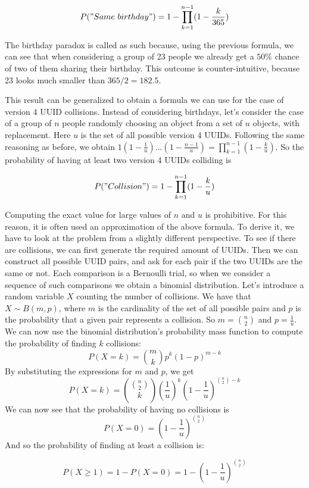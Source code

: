 \documentclass{report}
\begin{document}
$$P("Same\ birthday")=1-\prod_{k=1}^{n-1}(1-\frac{k}{365})$$

The birthday paradox is called as such because, using the previous formula, we can see that when considering a group of 23 people we already get a $50\%$ chance of two of
them sharing their birthday. This outcome is counter-intuitive, because 23 looks much smaller than $365/2=182.5$. \par

This result can be generalized to obtain a formula we can use for the case of version 4 UUID collisions. Instead of considering birthdays, let's consider the case of a group of $n$
people randomly choosing an object from a set of $u$ objects, with replacement. Here $u$ is the set of all possible version 4 UUIDs. Following the same reasoning as before, we obtain
$1(1-\frac{1}{u}) \dotso (1-\frac{n-1}{u}) = \prod_{k=1}^{n-1}(1-\frac{k}{u})$. So the probability of having at least two version 4 UUIDs colliding is

\begin{equation}\label{uuid_collision_exact_formula}
P("Collision")=1- \prod_{k=1}^{n-1}(1-\frac{k}{u})
\end{equation}

Computing the exact value for large values of $n$ and $u$ is prohibitive. For this reason, it is often used an approximation of the above formula. To derive it, we have to look at the
problem from a slightly different perspective. To see if there are collisions, we can first generate the required amount of UUIDs. Then we can construct all possible UUID pairs, and ask 
for each pair if the two UUIDs are the same or not. Each comparison is a Bernoulli trial, so when we consider a sequence of such comparisons we obtain a binomial distribution.
Let's introduce a random variable $X$ counting the number of collisions. We have that $X \sim B(m,p)$, where $m$ is the cardinality of the set of all possible pairs and $p$ is the
probability that a given pair represents a collision. So $m=\binom{n}{2}$ and $p=\frac{1}{u}$. We can now use the binomial distribution's probability mass function to compute the
probability of finding $k$ collisions: 
$$P(X=k)=\binom{m}{k}p^k(1-p)^{m-k}$$
By substituting the expressions for $m$ and $p$, we get
$$P(X=k)=\binom{\binom{n}{2}}{k}(\frac{1}{u})^k(1-\frac{1}{u})^{\binom{n}{2}-k}$$
We can now see that the probability of having no collisions is
$$P(X=0)=(1-\frac{1}{u})^{\binom{n}{2}}$$
And so the probability of finding at least a collision is:

\begin{equation} \label{uuid_collision_binomial_approximation}
		P(X \geq 1)=1-P(X=0)=1-(1-\frac{1}{u})^{\binom{n}{2}}
\end{equation}
\end{document}
